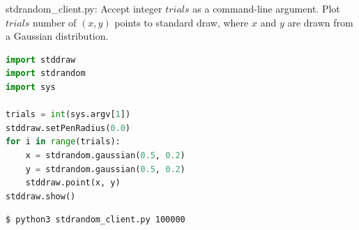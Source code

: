 \documentclass[8pt,a4paper,compress]{beamer}
\begin{document}
\begin{frame}[fragile]
\pause

\begin{framed}
\tiny stdrandom\_client.py: Accept integer $trials$ as a command-line argument. Plot $trials$ number of $(x, y)$ points to standard draw, where $x$ and $y$ are drawn from a Gaussian distribution.
\end{framed}

\begin{lstlisting}[language=Python,style=focusin]
import stddraw
import stdrandom
import sys

trials = int(sys.argv[1])
stddraw.setPenRadius(0.0)
for i in range(trials):
    x = stdrandom.gaussian(0.5, 0.2)
    y = stdrandom.gaussian(0.5, 0.2)
    stddraw.point(x, y)
stddraw.show()
\end{lstlisting}

\pause

\begin{minipage}{160pt}
\begin{lstlisting}[language={},style=focusin]
$ python3 stdrandom_client.py 100000
\end{lstlisting}
\end{minipage}%
\begin{minipage}{140pt}
\hfill {}
\end{minipage}
\end{frame}
\end{document}
